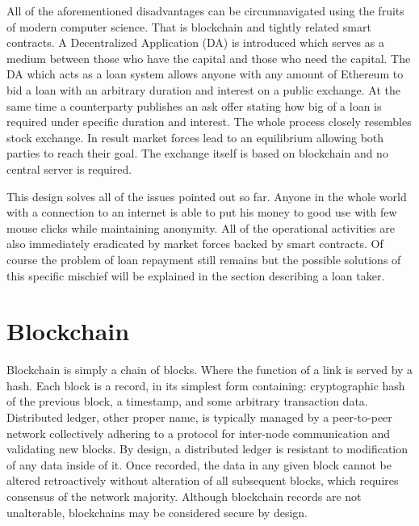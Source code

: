 \documentclass[a4paper,12pt,twoside,openany]{report}
\begin{document}
All of the aforementioned disadvantages can be circumnavigated using the fruits of modern computer science. That is blockchain and tightly related smart contracts. A Decentralized Application (DA) is introduced which serves as a medium between those who have the capital and those who need the capital. The DA which acts as a loan system allows anyone with any amount of Ethereum to bid a loan with an arbitrary duration and interest on a public exchange. At the same time a counterparty publishes an ask offer stating how big of a loan is required under specific duration and interest. The whole process closely resembles stock exchange. In result market forces lead to an equilibrium allowing both parties to reach their goal. The exchange itself is based on blockchain and no central server is required.

This design solves all of the issues pointed out so far. Anyone in the whole world with a connection to an internet is able to put his money to good use with few mouse clicks while maintaining anonymity. All of the operational activities are also immediately eradicated by market forces backed by smart contracts. Of course the problem of loan repayment still remains but the possible solutions of this specific mischief will be explained in the section describing a loan taker.

\section{Blockchain}

Blockchain is simply a chain of blocks. Where the function of a link is served by a hash. Each block is a record, in its simplest form containing: cryptographic hash of the previous block, a timestamp, and some arbitrary transaction data. Distributed ledger, other proper name, is typically managed by a peer-to-peer network collectively adhering to a protocol for inter-node communication and validating new blocks. By design, a distributed ledger is resistant to modification of any data inside of it.  Once recorded, the data in any given block cannot be altered retroactively without alteration of all subsequent blocks, which requires consensus of the network majority. Although blockchain records are not unalterable, blockchains may be considered secure by design. 
\end{document}
